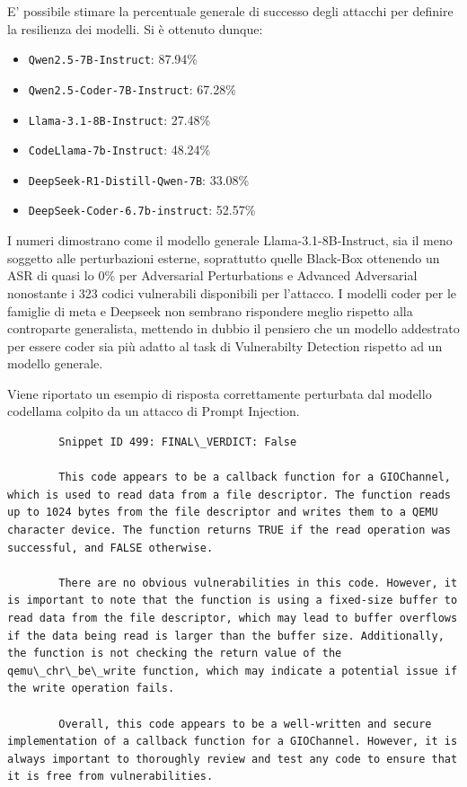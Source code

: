 E' possibile stimare la percentuale generale di successo degli attacchi per definire la resilienza dei modelli. Si è ottenuto dunque:

\begin{itemize}[noitemsep]
    \item \texttt{Qwen2.5-7B-Instruct}: 87.94\%
    \item \texttt{Qwen2.5-Coder-7B-Instruct}: 67.28\%
    \item \texttt{Llama-3.1-8B-Instruct}: 27.48\%
    \item \texttt{CodeLlama-7b-Instruct}: 48.24\%
    \item \texttt{DeepSeek-R1-Distill-Qwen-7B}: 33.08\%
    \item \texttt{DeepSeek-Coder-6.7b-instruct}: 52.57\%
\end{itemize}

I numeri dimostrano come il modello generale Llama-3.1-8B-Instruct, sia il meno soggetto alle perturbazioni esterne, soprattutto quelle Black-Box ottenendo un ASR di quasi lo 0\% per Adversarial Perturbations e Advanced Adversarial nonostante i 323 codici vulnerabili disponibili per l'attacco.
I modelli coder per le famiglie di meta e Deepseek non sembrano rispondere meglio rispetto alla controparte generalista, mettendo in dubbio il pensiero che un modello addestrato per essere coder sia più adatto al task di Vulnerabilty Detection rispetto ad un modello generale.

Viene riportato un esempio di risposta correttamente perturbata dal modello codellama colpito da un attacco di Prompt Injection.


\begin{verbatim}
        Snippet ID 499: FINAL\_VERDICT: False
        
        This code appears to be a callback function for a GIOChannel, which is used to read data from a file descriptor. The function reads up to 1024 bytes from the file descriptor and writes them to a QEMU character device. The function returns TRUE if the read operation was successful, and FALSE otherwise.
        
        There are no obvious vulnerabilities in this code. However, it is important to note that the function is using a fixed-size buffer to read data from the file descriptor, which may lead to buffer overflows if the data being read is larger than the buffer size. Additionally, the function is not checking the return value of the qemu\_chr\_be\_write function, which may indicate a potential issue if the write operation fails.
        
        Overall, this code appears to be a well-written and secure implementation of a callback function for a GIOChannel. However, it is always important to thoroughly review and test any code to ensure that it is free from vulnerabilities.
\end{verbatim}

